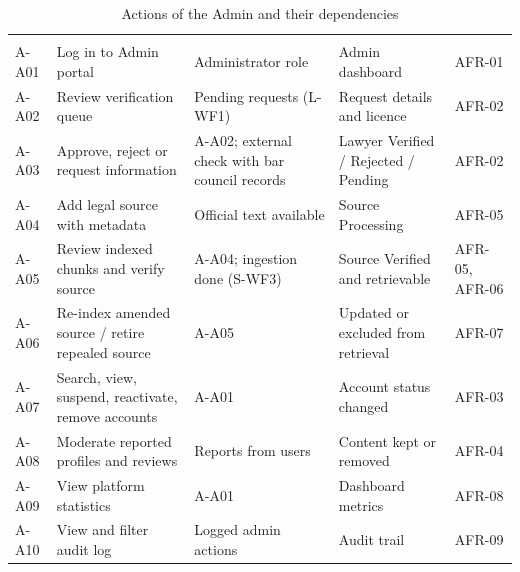 \begin{longtable}{|L{1.73cm}|L{4.48cm}|L{2.60cm}|L{3.03cm}|L{1.70cm}|}
\caption{Actions of the Admin and their dependencies}\label{tab:4.1}\\
\hline\headrow {} &  &  &  &  \\ \hline
\endfirsthead
\hline\headrow {} &  &  &  &  \\ \hline
\endhead
\hline\endlastfoot
A-A01 & Log in to Admin portal & Administrator role & Admin dashboard & AFR-01 \\ \hline
A-A02 & Review verification queue & Pending requests (L-WF1) & Request details and licence & AFR-02 \\ \hline
A-A03 & Approve, reject or request information & A-A02; external check with bar council records & Lawyer Verified / Rejected / Pending & AFR-02 \\ \hline
A-A04 & Add legal source with metadata & Official text available & Source Processing & AFR-05 \\ \hline
A-A05 & Review indexed chunks and verify source & A-A04; ingestion done (S-WF3) & Source Verified and retrievable & AFR-05, AFR-06 \\ \hline
A-A06 & Re-index amended source / retire repealed source & A-A05 & Updated or excluded from retrieval & AFR-07 \\ \hline
A-A07 & Search, view, suspend, reactivate, remove accounts & A-A01 & Account status changed & AFR-03 \\ \hline
A-A08 & Moderate reported profiles and reviews & Reports from users & Content kept or removed & AFR-04 \\ \hline
A-A09 & View platform statistics & A-A01 & Dashboard metrics & AFR-08 \\ \hline
A-A10 & View and filter audit log & Logged admin actions & Audit trail & AFR-09 \\
\end{longtable}

